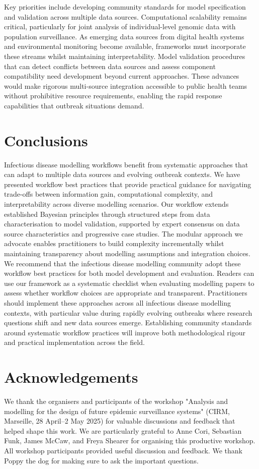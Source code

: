 \documentclass{article}
\begin{document}
Key priorities include developing community standards for model specification and validation across multiple data sources.
Computational scalability remains critical, particularly for joint analysis of individual-level genomic data with population surveillance.
As emerging data sources from digital health systems and environmental monitoring become available, frameworks must incorporate these streams whilst maintaining interpretability.
Model validation procedures that can detect conflicts between data sources and assess component compatibility need development beyond current approaches.
These advances would make rigorous multi-source integration accessible to public health teams without prohibitive resource requirements, enabling the rapid response capabilities that outbreak situations demand.


\section{Conclusions}

Infectious disease modelling workflows benefit from systematic approaches that can adapt to multiple data sources and evolving outbreak contexts.
We have presented workflow best practices that provide practical guidance for navigating trade-offs between information gain, computational complexity, and interpretability across diverse modelling scenarios.
Our workflow extends established Bayesian principles through structured steps from data characterisation to model validation, supported by expert consensus on data source characteristics and progressive case studies.
The modular approach we advocate enables practitioners to build complexity incrementally whilst maintaining transparency about modelling assumptions and integration choices.
We recommend that the infectious disease modelling community adopt these workflow best practices for both model development and evaluation.
Readers can use our framework as a systematic checklist when evaluating modelling papers to assess whether workflow choices are appropriate and transparent.
Practitioners should implement these approaches across all infectious disease modelling contexts, with particular value during rapidly evolving outbreaks where research questions shift and new data sources emerge.
Establishing community standards around systematic workflow practices will improve both methodological rigour and practical implementation across the field.

\section{Acknowledgements}

We thank the organisers and participants of the workshop "Analysis and modelling for the design of future epidemic surveillance systems" (CIRM, Marseille, 28 April–2 May 2025) for valuable discussions and feedback that helped shape this work.
We are particularly grateful to Anne Cori, Sebastian Funk, James McCaw, and Freya Shearer for organising this productive workshop.
All workshop participants provided useful discussion and feedback.
We thank Poppy the dog for making sure to ask the important questions.



\end{document}
